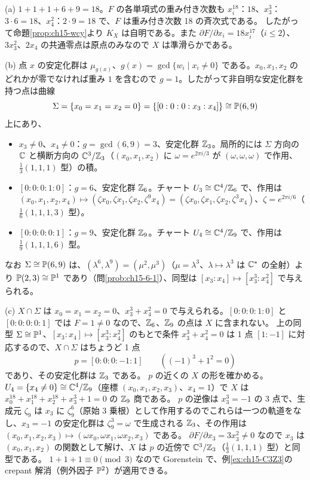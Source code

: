 (a) $1+1+1+6+9 = 18$。$F$ の各単項式の重み付き次数も $x_i^{18}$：$18$、$x_3^3$：$3\cdot6 = 18$、$x_4^2$：$2\cdot9 = 18$ で、$F$ は重み付き次数 18 の斉次式である。
したがって命題\ref{prop:ch15-wcy}より $K_X$ は自明である。また $\partial F/\partial x_i = 18x_i^{17}$（$i\le2$）、$3x_3^2$、$2x_4$ の共通零点は原点のみなので $X$ は準滑らかである。

(b) 点 $x$ の安定化群は $\mu_{g(x)}$、$g(x) = \gcd\{w_i\mid x_i\neq0\}$ である。$x_0,x_1,x_2$ のどれかが零でなければ重み $1$ を含むので $g = 1$。したがって非自明な安定化群を持つ点は曲線
\[
\Sigma = \{x_0 = x_1 = x_2 = 0\} = \{[0:0:0:x_3:x_4]\}\cong\mathbb{P}(6,9)
\]
上にあり、
\begin{itemize}
\item $x_3\neq0$、$x_4\neq0$：$g = \gcd(6,9) = 3$、安定化群 $\mathbb{Z}_3$。局所的には $\Sigma$ 方向の $\mathbb{C}$ と横断方向の $\mathbb{C}^3/\mathbb{Z}_3$（$(x_0,x_1,x_2)$ に $\omega = e^{2\pi i/3}$ が $(\omega,\omega,\omega)$ で作用、$\frac13(1,1,1)$ 型）の積。
\item $[0:0:0:1:0]$：$g = 6$、安定化群 $\mathbb{Z}_6$。チャート $U_3\cong\mathbb{C}^4/\mathbb{Z}_6$ で、作用は $(x_0,x_1,x_2,x_4)\mapsto(\zeta x_0,\zeta x_1,\zeta x_2,\zeta^9x_4) = (\zeta x_0,\zeta x_1,\zeta x_2,\zeta^3x_4)$、$\zeta = e^{2\pi i/6}$（$\frac16(1,1,1,3)$ 型）。
\item $[0:0:0:0:1]$：$g = 9$、安定化群 $\mathbb{Z}_9$。チャート $U_4\cong\mathbb{C}^4/\mathbb{Z}_9$ で、作用は $\frac19(1,1,1,6)$ 型。
\end{itemize}
なお $\Sigma\cong\mathbb{P}(6,9)$ は、$(\lambda^6,\lambda^9) = (\mu^2,\mu^3)$（$\mu = \lambda^3$、$\lambda\mapsto\lambda^3$ は $\mathbb{C}^*$ の全射）より $\mathbb{P}(2,3)\cong\mathbb{P}^1$ であり（問\ref{prob:ch15-6-1}）、同型は $[x_3:x_4]\mapsto[x_3^3:x_4^2]$ で与えられる。

(c) $X\cap\Sigma$ は $x_0 = x_1 = x_2 = 0$、$x_3^3 + x_4^2 = 0$ で与えられる。$[0:0:0:1:0]$ と $[0:0:0:0:1]$ では $F = 1\neq0$ なので、$\mathbb{Z}_6$、$\mathbb{Z}_9$ の点は $X$ に含まれない。
上の同型 $\Sigma\cong\mathbb{P}^1$、$[x_3:x_4]\mapsto[x_3^3:x_4^2]$ のもとで条件 $x_3^3 + x_4^2 = 0$ は 1 点 $[1:-1]$ に対応するので、$X\cap\Sigma$ はちょうど 1 点
\[
p = [0:0:0:-1:1]\qquad((-1)^3 + 1^2 = 0)
\]
であり、その安定化群は $\mathbb{Z}_3$ である。
$p$ の近くの $X$ の形を確かめる。$U_4 = \{x_4\ne0\}\cong\mathbb{C}^4/\mathbb{Z}_9$（座標 $(x_0,x_1,x_2,x_3)$、$x_4 = 1$）で $X$ は $x_0^{18}+x_1^{18}+x_2^{18}+x_3^3+1 = 0$ の $\mathbb{Z}_9$ 商である。
$p$ の逆像は $x_3^3 = -1$ の 3 点で、生成元 $\zeta_9$ は $x_3$ に $\zeta_9^6$（原始 3 乗根）として作用するのでこれらは一つの軌道をなし、$x_3 = -1$ の安定化群は $\zeta_9^3 = \omega$ で生成される $\mathbb{Z}_3$、その作用は $(x_0,x_1,x_2,x_3)\mapsto(\omega x_0,\omega x_1,\omega x_2,x_3)$ である。
$\partial F/\partial x_3 = 3x_3^2\neq0$ なので $x_3$ は $(x_0,x_1,x_2)$ の関数として解け、$X$ は $p$ の近傍で $\mathbb{C}^3/\mathbb{Z}_3$（$\frac13(1,1,1)$ 型）と同型である。
$1+1+1\equiv0\pmod 3$ なので Gorenstein で、例\ref{ex:ch15-C3Z3}の crepant 解消（例外因子 $\mathbb{P}^2$）が適用できる。

